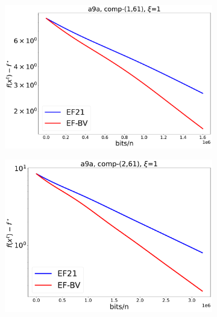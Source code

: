 \documentclass{article} %
\theoremstyle{plain}
\theoremstyle{definition}
\theoremstyle{remark}
\begin{document}
   \begin{figure}[!htbp]
      \centering
      \begin{subfigure}[b]{0.32\textwidth}
         \centering
         \includegraphics[width=\textwidth]{img/a9a/CompK_61_1_a9a_8124workers_3000K_32561_a9a_61_1_1_1_logreg_diff_conv.pdf}
         \label{001}
      \end{subfigure}
      \hfill
      \begin{subfigure}[b]{0.32\textwidth}
         \centering
         \includegraphics[width=\textwidth]{img/a9a/CompK_61_2_a9a_8124workers_3000K_32561_a9a_61_2_1_1_logreg_diff_conv.pdf}
         \label{002}
      \end{subfigure}
      \hfill

\end{figure}
\end{document}
